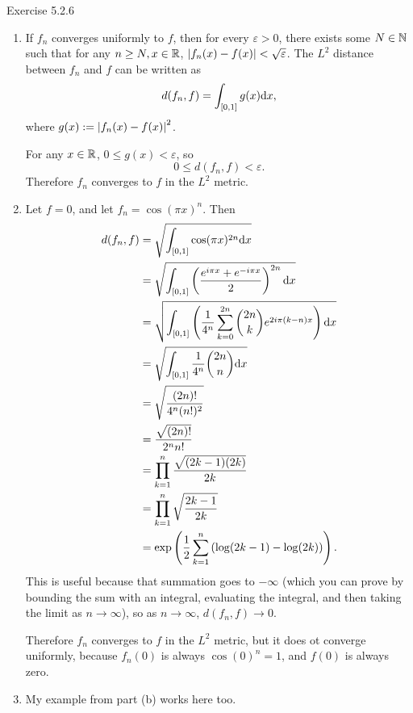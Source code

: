 \documentclass{article}
\begin{document}
\bigskip
\begin{prob}
    Exercise 5.2.6
\end{prob}
\begin{enumerate}[label=(\alph*)]
    \item If $f_n$ converges uniformly to $f$, then for every $\varepsilon > 0$, there exists some $N \in \mathbb{N}$ such that for any $n \geq N, x \in \mathbb{R}$, $\left\lvert f_n(x)-f(x) \right\rvert < \sqrt{\varepsilon}$. The $L^2$ distance between $f_n$ and $f$ can be written as
        \[ d(f_n, f) = \int_{[0,1]} g(x) \mathrm{d} x, \]
        where $g(x) := \left\lvert f_n(x)-f(x) \right\rvert^2$.
        \par
        For any $x \in \mathbb{R}$, $0 \leq g(x) < \varepsilon$, so
        \[ 0 \leq d(f_n,f) < \varepsilon. \]
        Therefore $f_n$ converges to $f$ in the $L^2$ metric.
    \item Let $f=0$, and let $f_n=\cos(\pi x)^n$. Then
        \begin{align*}
            d(f_n, f) &= \sqrt{\int_{[0,1]} \cos(\pi x)^{2n} \mathrm{d} x} \\
                      &= \sqrt{\int_{[0,1]} \left( \frac{e^{i\pi x}+e^{-i \pi x}}{2} \right)^{2n} \mathrm{d} x} \\
                      &= \sqrt{\int_{[0,1]} \left( \frac{1}{4^n} \sum_{k=0}^{2n} \binom{2n}{k} e^{2i\pi (k-n) x} \right) \mathrm{d} x} \\
                      &= \sqrt{\int_{[0,1]} \frac{1}{4^n} \binom{2n}{n}  \mathrm{d} x} \\
                      &= \sqrt{ \frac{(2n)!}{4^n(n!)^2} } \\
                      &= \frac{\sqrt{(2n)!}}{2^n n!} \\
                      &= \prod_{k=1}^n \frac{\sqrt{(2k-1)(2k)}}{2k} \\
                      &= \prod_{k=1}^n \sqrt{ \frac{2k-1}{2k}} \\
                      &= \exp\left( \frac{1}{2} \sum_{k=1}^n \left( \log(2k-1)-\log(2k) \right)  \right).
        \end{align*}
        This is useful because that summation goes to $-\infty$ (which you can prove by bounding the sum with an integral, evaluating the integral, and then taking the limit as $n \rightarrow \infty$), so as $n \rightarrow \infty$, $d(f_n, f) \rightarrow 0$.
        \par
        Therefore $f_n$ converges to $f$ in the $L^2$ metric, but it does ot converge uniformly, because $f_n(0)$ is always $\cos(0)^n=1$, and $f(0)$ is always zero.
    \item My example from part (b) works here too.

\end{enumerate}
\end{document}
